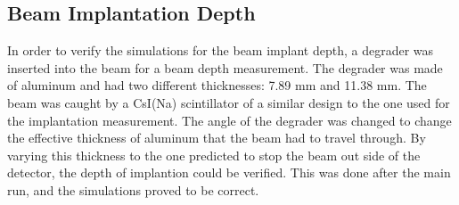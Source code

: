 \subsection{Beam Implantation Depth}
In order to verify the simulations for the beam implant depth, a degrader was inserted into the beam for a beam depth measurement.
The degrader was made of aluminum and had two different thicknesses: 7.89 mm and 11.38 mm.
The beam was caught by a CsI(Na) scintillator of a similar design to the one used for the implantation measurement.
The angle of the degrader was changed to change the effective thickness of aluminum that the beam had to travel through.
By varying this thickness to the one predicted to stop the beam out side of the detector, the depth of implantion could be verified.
This was done after the main run, and the simulations proved to be correct.

